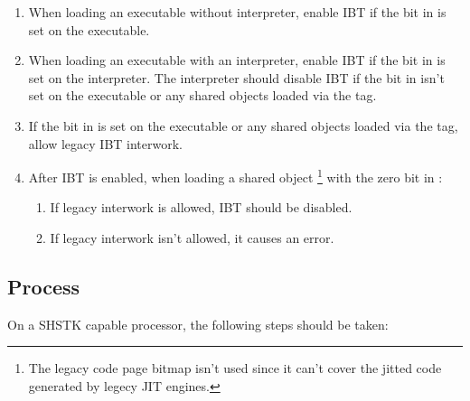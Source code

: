 \begin{enumerate}
  \item
    \begin{sloppypar}
      When loading an executable without interpreter, enable IBT if
      the  bit in
       is set on the executable.
    \end{sloppypar}
  \item
    \begin{sloppypar}
      When loading an executable with an interpreter, enable IBT if
      the  bit in
       is set on the interpreter.
      The interpreter should disable IBT if the
       bit in
       isn't set on the executable
      or any shared objects loaded via the  tag.
    \end{sloppypar}
   \item If the  bit in
      is set on the
     executable or any shared objects loaded via the
      tag, allow legacy IBT interwork.
  \item
    \begin{sloppypar}
      After IBT is enabled, when loading a shared object
      \footnote{The legacy code page bitmap isn't used since it can't
      cover the jitted code generated by legecy JIT engines.}
      with the zero  bit in
      :
    \end{sloppypar}
    \begin{enumerate}
      \item If legacy interwork is allowed, IBT should be disabled.
      \item If legacy interwork isn't allowed, it causes an error.
    \end{enumerate}
\end{enumerate}

\subsection{Process }
\label{shstk}

On a SHSTK capable processor, the following steps should be taken:

